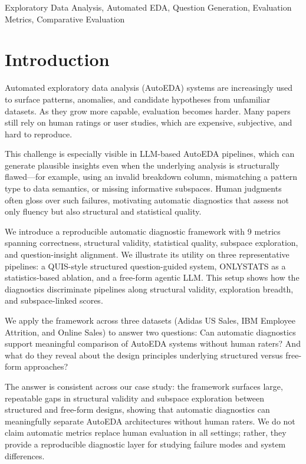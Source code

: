 \documentclass[conference]{IEEEtran}
\begin{document}
\begin{IEEEkeywords}
Exploratory Data Analysis, Automated EDA, Question Generation, Evaluation Metrics, Comparative Evaluation
\end{IEEEkeywords}

\section{Introduction}
Automated exploratory data analysis (AutoEDA) systems are increasingly used to surface patterns, anomalies, and candidate hypotheses from unfamiliar datasets. As they grow more capable, evaluation becomes harder. Many papers still rely on human ratings or user studies, which are expensive, subjective, and hard to reproduce.

This challenge is especially visible in LLM-based AutoEDA pipelines, which can generate plausible insights even when the underlying analysis is structurally flawed---for example, using an invalid breakdown column, mismatching a pattern type to data semantics, or missing informative subspaces. Human judgments often gloss over such failures, motivating automatic diagnostics that assess not only fluency but also structural and statistical quality.

We introduce a reproducible automatic diagnostic framework with 9 metrics spanning correctness, structural validity, statistical quality, subspace exploration, and question-insight alignment. We illustrate its utility on three representative pipelines: a QUIS-style structured question-guided system, ONLYSTATS as a statistics-based ablation, and a free-form agentic LLM. This setup shows how the diagnostics discriminate pipelines along structural validity, exploration breadth, and subspace-linked scores.

We apply the framework across three datasets (Adidas US Sales, IBM Employee Attrition, and Online Sales) to answer two questions: Can automatic diagnostics support meaningful comparison of AutoEDA systems without human raters? And what do they reveal about the design principles underlying structured versus free-form approaches?

The answer is consistent across our case study: the framework surfaces large, repeatable gaps in structural validity and subspace exploration between structured and free-form designs, showing that automatic diagnostics can meaningfully separate AutoEDA architectures without human raters. We do not claim automatic metrics replace human evaluation in all settings; rather, they provide a reproducible diagnostic layer for studying failure modes and system differences.
\end{document}
